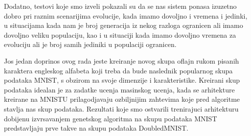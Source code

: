 \documentclass[eng]{simposium}
\begin{document}
Dodatno, testovi koje smo izveli pokazali su da se nas sistem ponasa izuzetno dobro pri raznim scenarijima evolucije, 
kada imamo dovoljno i vremena i jedinki, u situacijama kada nam je broj generacija iz nekog razloga ogranicen ali imamo dovoljno 
veliku populaciju, kao i u situaciji kada imamo dovoljno vremena za evoluciju ali je broj samih jediniki u populaciji ogranicen.

Jos jedan doprinos ovog rada jeste kreiranje novog skupa oflajn rukom pisanih karaktera engleskog alfabeta koji treba da bude 
naslednik popularnog skupa podataka MNIST, s obzirom na svoje dimenzije i karakteristike. Kreirani skup podataka idealan je 
za zadatke ucenja masinskog ucenja, kada se arhitekture kreirane na MNISTU prilagodjavaju ozbiljnijim zahtevima koje pred 
algoritme stavlja nas skup podataka. 
Rezultati koje smo ostvarili trenirajuci arhitekturu dobijenu izvrsavanjem genetskog algoritma na skupu podataka MNIST predstavljaju 
prve takve na skupu podataka DoubledMNIST.

\newpage
\end{document}
